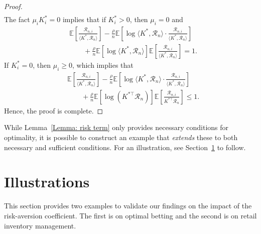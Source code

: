 \begin{proof}
\begin{align*}
    \end{align*}
    The fact $\mu_i K_i^*=0$ implies that if $K_i^* > 0$, then $\mu_i = 0$ and
    \begin{align*}
        & \mathbb{E}\left[ \frac{\mathcal{R}_{n,i}}{ \langle K^{*}, \mathcal{R}_n \rangle } \right] 
        - \frac{\rho}{n} \mathbb{E}\left[ \log \langle K^{*}, \mathcal{R}_n \rangle \cdot \frac{\mathcal{R}_{n,i}}{\langle K^{*}, \mathcal{R}_n \rangle } \right] \\
        &\qquad + \frac{\rho}{n}\mathbb{E}\left[ \log \langle K^{*}, \mathcal{R}_n \rangle \right] \mathbb{E}\left[ \frac{\mathcal{R}_{n,i}}{\langle K^{*}, \mathcal{R}_n \rangle} \right] = 1.
    \end{align*}
    If $K_i^* = 0$, then $\mu_i \geq 0$, which implies that
    \begin{align*}
        & \mathbb{E}\left[ \frac{\mathcal{R}_{n,i}}{\langle K^{*}, \mathcal{R}_n \rangle } \right] - \frac{\rho}{n}\mathbb{E} \left[ \log \langle K^{*}, \mathcal{R}_n \rangle  \cdot \frac{\mathcal{R}_{n,i}}{\langle K^{*}, \mathcal{R}_n \rangle } \right] \\
        &\qquad +\frac{\rho}{n}\mathbb{E}\left[ \log(K^{*\top}\mathcal{R}_n) \right] \mathbb{E}\left[ \frac{\mathcal{R}_{n,i}}{K^{*\top}\mathcal{R}_n} \right] \leq 1.
    \end{align*}
Hence, the proof is complete.    
\end{proof}


\begin{remark}\rm
    While Lemma~\ref{Lemma: risk term} only provides necessary conditions for optimality, it is possible to construct an example that {\em extends} these to both necessary and sufficient conditions. For an illustration,  see Section~\ref{section: Illustrative Examples} to follow.
\end{remark}




\section{Illustrations} \label{section: Illustrative Examples}
This section provides two examples to validate our findings on the impact of the risk-aversion coefficient. The first is on optimal betting and the second is on retail inventory management.


